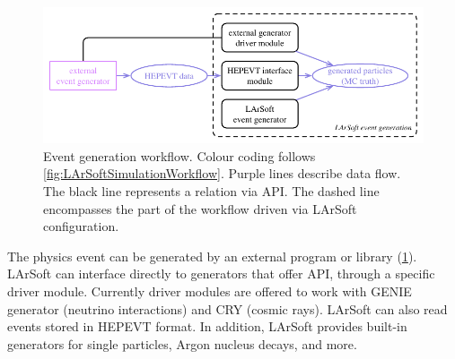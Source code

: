 \begin{figure}
   \centering
   \includegraphics{figures/LArSoftEventGeneration}
   \caption[Event generation workflow]{\label{fig:LArSoftEventGeneration}
      Event generation workflow.
      Colour coding follows \cref{fig:LArSoftSimulationWorkflow}.
      Purple lines describe data flow. The black line represents a relation via API.
      The dashed line encompasses the part of the workflow driven via LArSoft configuration.
   }
\end{figure}
The physics event can be generated by an external program or library (\cref{fig:LArSoftEventGeneration}).
LArSoft can interface directly to generators that offer API, through a specific driver module.
Currently driver modules are offered to work
with GENIE generator (neutrino interactions) and CRY (cosmic rays).
LArSoft can also read events stored in HEPEVT format.
In addition, LArSoft provides built-in generators for single particles,
Argon nucleus decays, and more.

